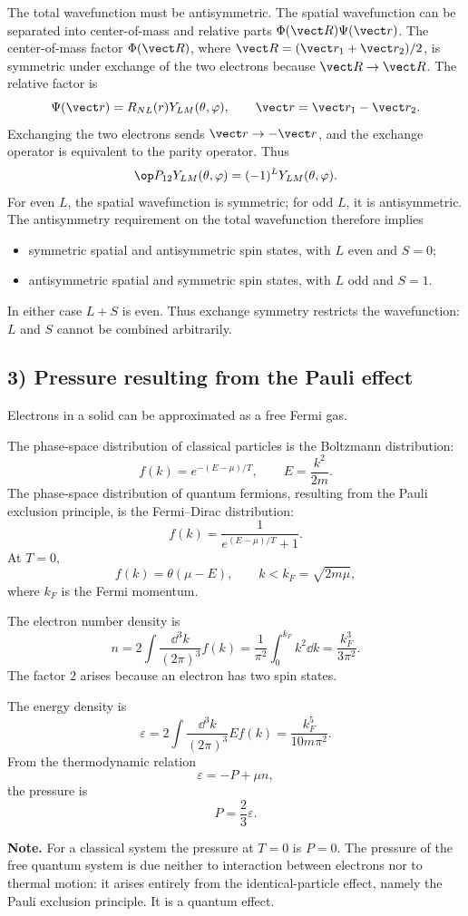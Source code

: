The total wavefunction must be antisymmetric. The spatial wavefunction can be separated into center-of-mass and relative parts $\Phi(\vect R)\Psi(\vect r)$. The center-of-mass factor $\Phi(\vect R)$, where $\vect R=(\vect r_1+\vect r_2)/2$, is symmetric under exchange of the two electrons because $\vect R\to\vect R$. The relative factor is
\[\Psi(\vect r)=R_{NL}(r)Y_{LM}(\theta,\varphi),
\qquad\vect r=\vect r_1-\vect r_2.\]
Exchanging the two electrons sends $\vect r\to-\vect r$, and the exchange operator is equivalent to the parity operator. Thus
\[\op P_{12}Y_{LM}(\theta,\varphi)
=(-1)^L Y_{LM}(\theta,\varphi).\]
For even $L$, the spatial wavefunction is symmetric; for odd $L$, it is antisymmetric. The antisymmetry requirement on the total wavefunction therefore implies
\begin{itemize}
\item symmetric spatial and antisymmetric spin states, with $L$ even and $S=0$;
\item antisymmetric spatial and symmetric spin states, with $L$ odd and $S=1$.
\end{itemize}
In either case $L+S$ is even. Thus exchange symmetry restricts the wavefunction: $L$ and $S$ cannot be combined arbitrarily.

\subsection*{3) Pressure resulting from the Pauli effect}
Electrons in a solid can be approximated as a free Fermi gas.

The phase-space distribution of classical particles is the Boltzmann distribution:
\[f(k)=e^{-(E-\mu)/T},\qquad E=\frac{k^2}{2m}.\]
The phase-space distribution of quantum fermions, resulting from the Pauli exclusion principle, is the Fermi--Dirac distribution:
\[f(k)=\frac1{e^{(E-\mu)/T}+1}.\]
At $T=0$,
\[f(k)=\theta(\mu-E),\qquad
k<k_F=\sqrt{2m\mu},\]
where $k_F$ is the Fermi momentum.

The electron number density is
\[n=2\int\frac{\dd^3k}{(2\pi)^3}f(k)
=\frac1{\pi^2}\int_0^{k_F}k^2\dd k
=\frac{k_F^3}{3\pi^2}.\]
The factor $2$ arises because an electron has two spin states.

The energy density is
\[\varepsilon=2\int\frac{\dd^3k}{(2\pi)^3}E f(k)
=\frac{k_F^5}{10m\pi^2}.\]
From the thermodynamic relation
\[\varepsilon=-P+\mu n,\]
the pressure is
\[P=\frac23\varepsilon.\]

\textbf{Note.} For a classical system the pressure at $T=0$ is $P=0$. The pressure of the free quantum system is due neither to interaction between electrons nor to thermal motion: it arises entirely from the identical-particle effect, namely the Pauli exclusion principle. It is a quantum effect.